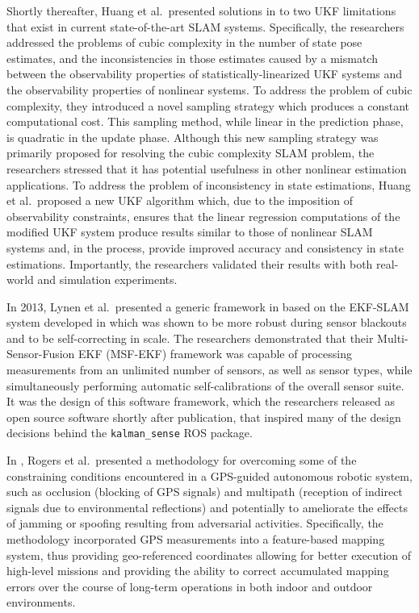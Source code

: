 Shortly thereafter, Huang et al.\ presented solutions in \cite{Huang2013} to two UKF limitations that exist in current state-of-the-art SLAM systems. Specifically, the researchers addressed the problems of cubic complexity in the number of state pose estimates, and the inconsistencies in those estimates caused by a mismatch between the observability properties of statistically-linearized UKF systems and the observability properties of nonlinear systems. To address the problem of cubic complexity, they introduced a novel sampling strategy which produces a constant computational cost. This sampling method, while linear in the prediction phase, is quadratic in the update phase. Although this new sampling strategy was primarily proposed for resolving the cubic complexity SLAM problem, the researchers stressed that it has potential usefulness in other nonlinear estimation applications. To address the problem of inconsistency in state estimations, Huang et al.\ proposed a new UKF algorithm which, due to the imposition of observability constraints, ensures that the linear regression computations of the modified UKF system produce results similar to those of nonlinear SLAM systems and, in the process, provide improved accuracy and consistency in state estimations. Importantly, the researchers validated their results with both real-world and simulation experiments.

In 2013, Lynen et al.\ presented a generic framework in \cite{Lynen2013} based on the EKF-SLAM system developed in \cite{Weiss2012} which was shown to be more robust during sensor blackouts and to be self-correcting in scale. The researchers demonstrated that their Multi-Sensor-Fusion EKF (MSF-EKF) framework was capable of processing measurements from an unlimited number of sensors, as well as sensor types, while simultaneously performing automatic self-calibrations of the overall sensor suite. It was the design of this software framework, which the researchers released as open source software shortly after publication, that inspired many of the design decisions behind the \texttt{kalman\_sense} ROS package.

In \cite{Rogers2014}, Rogers et al.\ presented a methodology for overcoming some of the constraining conditions encountered in a GPS-guided autonomous robotic system, such as occlusion (blocking of GPS signals) and multipath (reception of indirect signals due to environmental reflections) and potentially to ameliorate the effects of jamming or spoofing resulting from adversarial activities. Specifically, the methodology incorporated GPS measurements into a feature-based mapping system, thus providing geo-referenced coordinates allowing for better execution of high-level missions and providing the ability to correct accumulated mapping errors over the course of long-term operations in both indoor and outdoor environments.

